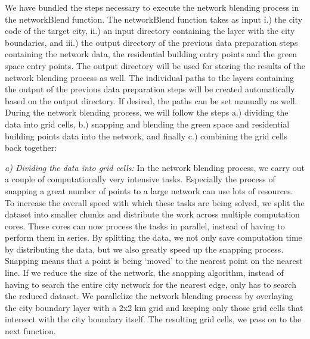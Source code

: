 \documentclass[10pt]{article}
\begin{document}
We have bundled the steps necessary to execute the network blending process in the networkBlend function.
The networkBlend function takes as input i.) the city code of the target city, ii.) an input directory containing the layer with the city boundaries, and iii.) the output directory of the previous data preparation steps containing the network data, the residential building entry points and the green space entry points.
The output directory will be used for storing the results of the network blending process as well.
The individual paths to the layers containing the output of the previous data preparation steps will be created automatically based on the output directory.
If desired, the paths can be set manually as well.
During the network blending process, we will follow the steps a.) dividing the data into grid cells, b.) snapping and blending the green space and residential building points data into the network, and finally c.) combining the grid cells back together:

\textit{a) Dividing the data into grid cells:} In the network blending process, we carry out a couple of computationally very intensive tasks. Especially the process of snapping a great number of points to a large network can use lots of resources. To increase the overall speed with which these tasks are being solved, we split the dataset into smaller chunks and distribute the work across multiple computation cores. These cores can now process the tasks in parallel, instead of having to perform them in series. By splitting the data, we not only save computation time by distributing the data, but we also greatly speed up the snapping process. Snapping means that a point is being ‘moved’ to the nearest point on the nearest line. If we reduce the size of the network, the snapping algorithm, instead of having to search the entire city network for the nearest edge, only has to search the reduced dataset. We parallelize the network blending process by overlaying the city boundary layer with a 2x2 km grid and keeping only those grid cells that intersect with the city boundary itself. The resulting grid cells, we pass on to the next function.
\end{document}
